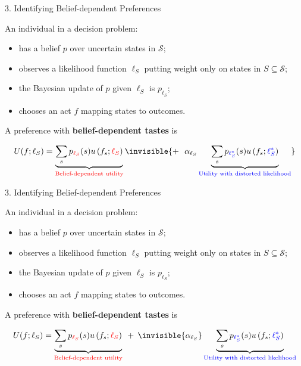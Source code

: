 \documentclass[usenames,dvipsnames,aspectratio=169,11pt]{beamer}
\begin{document}
\begin{frame}{3. Identifying Belief-dependent Preferences}

	An individual in a decision problem:

	\vfill

	\begin{itemize}
		\item has a belief \( p \) over uncertain states in \( \mathcal{S} \); \pause
		\item observes a likelihood function \( \ell_S \) putting weight only on states in \( S \subseteq \mathcal{S} \); \pause
		\item the Bayesian update of \( p \) given \( \ell_S \) is \( p_{\ell_S} \); \pause
		\item chooses an act \( f \) mapping states to outcomes. \pause
	\end{itemize}

	\vfill

	A preference with \textbf{belief-dependent tastes} is
	\vfill

	\[
		U (f ; \ell_S)= \underbrace{\sum_s p_{\textcolor{red}{\ell_S}} (s) u\left(f_s ; \textcolor{red}{\ell_S} \right)}_{\text{\textcolor{red}{Belief-dependent utility}}} \invisible{+ \: \: \: \alpha_{\ell_S} \underbrace{\sum_s p_{\textcolor{blue}{\ell^{*}_{S}}} (s) u\left(f_s ; \textcolor{blue}{\ell^{*}_{S}} \right)}_{\text{\textcolor{blue}{Utility with distorted likelihood}}}}
	\]


\end{frame}

\begin{frame}[noframenumbering]{3. Identifying Belief-dependent Preferences}

	An individual in a decision problem:

	\vfill

	\begin{itemize}
		\item has a belief \( p \) over uncertain states in \( \mathcal{S} \);
		\item observes a likelihood function \( \ell_S \) putting weight only on states in \( S \subseteq \mathcal{S} \);
		\item the Bayesian update of \( p \) given \( \ell_S \) is \( p_{\ell_S} \);
		\item chooses an act \( f \) mapping states to outcomes.
	\end{itemize}

	\vfill

	A preference with \textbf{belief-dependent tastes} is
	\vfill

	\[
		U (f ; \ell_S)= \underbrace{\sum_s p_{\textcolor{red}{\ell_S}} (s) u\left(f_s ; \textcolor{red}{\ell_S} \right)}_{\text{\textcolor{red}{Belief-dependent utility}}} \: \: + \: \: \invisible{\alpha_{\ell_S}} \underbrace{\sum_s p_{\textcolor{blue}{\ell^{*}_{S}}} (s) u\left(f_s ; \textcolor{blue}{\ell^{*}_{S}} \right)}_{\text{\textcolor{blue}{Utility with distorted likelihood}}}
	\]


\end{frame}
\end{document}

